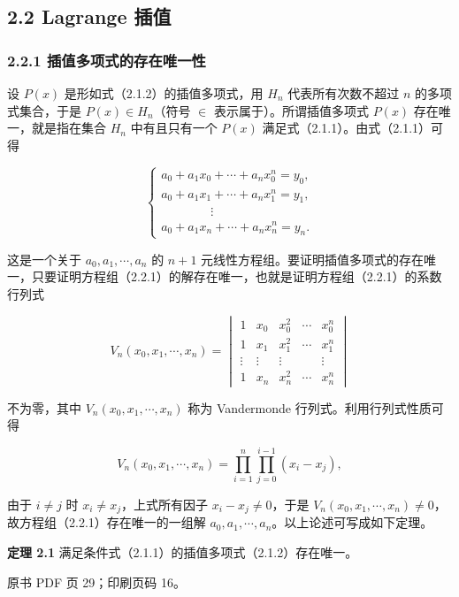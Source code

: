 \subsection{2.2 Lagrange 插值}\label{ch02a-lagrange-ux63d2ux503c}

\subsubsection{2.2.1 插值多项式的存在唯一性}\label{ch02a-ux63d2ux503cux591aux9879ux5f0fux7684ux5b58ux5728ux552fux4e00ux6027}

设 \(P(x)\) 是形如式（2.1.2）的插值多项式，用 \(H_n\) 代表所有次数不超过 \(n\) 的多项式集合，于是 \(P(x)\in H_n\)（符号 \(\in\) 表示属于）。所谓插值多项式 \(P(x)\) 存在唯一，就是指在集合 \(H_n\) 中有且只有一个 \(P(x)\) 满足式（2.1.1）。由式（2.1.1）可得

\[
\begin{cases}
a_0+a_1x_0+\cdots+a_nx_0^n=y_0,\\
a_0+a_1x_1+\cdots+a_nx_1^n=y_1,\\
\qquad\qquad\vdots\\
a_0+a_1x_n+\cdots+a_nx_n^n=y_n.
\end{cases}
\tag{2.2.1}
\]

这是一个关于 \(a_0,a_1,\cdots,a_n\) 的 \(n+1\) 元线性方程组。要证明插值多项式的存在唯一，只要证明方程组（2.2.1）的解存在唯一，也就是证明方程组（2.2.1）的系数行列式

\[
V_n(x_0,x_1,\cdots,x_n)=
\begin{vmatrix}
1 & x_0 & x_0^2 & \cdots & x_0^n\\
1 & x_1 & x_1^2 & \cdots & x_1^n\\
\vdots & \vdots & \vdots & & \vdots\\
1 & x_n & x_n^2 & \cdots & x_n^n
\end{vmatrix}
\tag{2.2.2}
\]

不为零，其中 \(V_n(x_0,x_1,\cdots,x_n)\) 称为 Vandermonde 行列式。利用行列式性质可得

\[
V_n(x_0,x_1,\cdots,x_n)
=\prod_{i=1}^{n}\prod_{j=0}^{i-1}(x_i-x_j),
\]

由于 \(i\ne j\) 时 \(x_i\ne x_j\)，上式所有因子 \(x_i-x_j\ne0\)，于是 \(V_n(x_0,x_1,\cdots,x_n)\ne0\)，故方程组（2.2.1）存在唯一的一组解 \(a_0,a_1,\cdots,a_n\)。以上论述可写成如下定理。

\textbf{定理 2.1} 满足条件式（2.1.1）的插值多项式（2.1.2）存在唯一。

\clearpage

原书 PDF 页 29；印刷页码 16。


